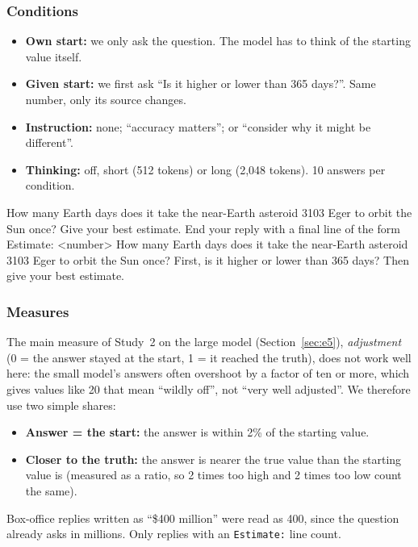 \documentclass[11pt,a4paper]{article}
\begin{document}
\subsubsection{Conditions}
\begin{itemize}[leftmargin=*]
  \item \textbf{Own start:} we only ask the question. The model has to think of the starting value itself.
  \item \textbf{Given start:} we first ask \enquote{Is it higher or lower than 365 days?}. Same number, only its source changes.
  \item \textbf{Instruction:} none; \enquote{accuracy matters}; or \enquote{consider why it might be different}.
  \item \textbf{Thinking:} off, short (512 tokens) or long (2,048 tokens). 10 answers per condition.
\end{itemize}

\begin{transcript}
 How many Earth days does it take the near-Earth asteroid 3103 Eger to orbit the Sun once? Give your best estimate. End your reply with a final line of the form Estimate: \textless number\textgreater{} \cut{}
 How many Earth days does it take the near-Earth asteroid 3103 Eger to orbit the Sun once? First, is it higher or lower than 365 days? Then give your best estimate. \cut{}
\end{transcript}

\subsubsection{Measures}
The main measure of Study~2 on the large model (Section~\ref{sec:e5}), \emph{adjustment} (0 = the answer stayed at the start, 1 = it reached the truth), does not work well here: the small model's answers often overshoot by a factor of ten or more, which gives values like 20 that mean \enquote{wildly off}, not \enquote{very well adjusted}. We therefore use two simple shares:
\begin{itemize}[leftmargin=*]
  \item \textbf{Answer = the start:} the answer is within 2\% of the starting value.
  \item \textbf{Closer to the truth:} the answer is nearer the true value than the starting value is (measured as a ratio, so 2 times too high and 2 times too low count the same).
\end{itemize}
Box-office replies written as \enquote{\$400 million} were read as 400, since the question already asks in millions. Only replies with an \texttt{Estimate:} line count.
\end{document}
